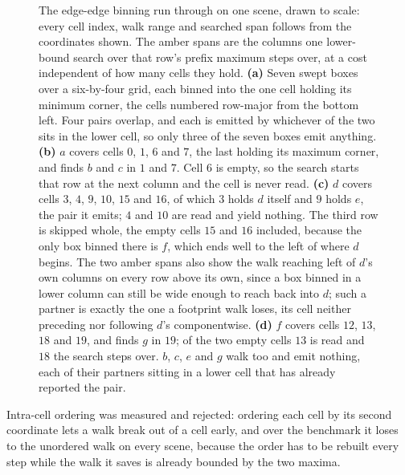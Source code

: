 \begin{figure}[htbp]
  \centering
  
  \caption{The edge-edge binning run through on one scene, drawn to scale: every
    cell index, walk range and searched span follows from the coordinates shown.
    The amber spans are the columns one lower-bound search over that row's
    prefix maximum steps over, at a cost independent of how many cells they
    hold. \textbf{(a)} Seven swept boxes over a six-by-four grid, each binned
    into the one cell holding its minimum corner, the cells numbered row-major
    from the bottom left. Four pairs overlap, and each is emitted by whichever
    of the two sits in the lower cell, so only three of the seven boxes emit
    anything. \textbf{(b)} $a$ covers cells $0$, $1$, $6$ and $7$, the last
    holding its maximum corner, and finds $b$ and $c$ in $1$ and $7$. Cell $6$
    is empty, so the search starts that row at the next column and the cell is
    never read. \textbf{(c)} $d$ covers cells $3$, $4$, $9$, $10$, $15$ and
    $16$, of which $3$ holds $d$ itself and $9$ holds $e$, the pair it emits;
    $4$ and $10$ are read and yield nothing. The third row is skipped whole, the
    empty cells $15$ and $16$ included, because the only box binned there is
    $f$, which ends well to the left of where $d$ begins. The two amber spans
    also show the walk reaching left of $d$'s own columns on every row above its
    own, since a box binned in a lower column can still be wide enough to reach
    back into $d$; such a partner is exactly the one a footprint walk loses, its
    cell neither preceding nor following $d$'s componentwise. \textbf{(d)} $f$
    covers cells $12$, $13$, $18$ and $19$, and finds $g$ in $19$; of the two
    empty cells $13$ is read and $18$ the search steps over. $b$, $c$, $e$ and
    $g$ walk too and emit nothing, each of their partners sitting in a lower
    cell that has already reported the pair.}
  \label{fig:cellmin}
\end{figure}

Intra-cell ordering was measured and rejected: ordering each cell by its second
coordinate lets a walk break out of a cell early, and over the benchmark it
loses to the unordered walk on every scene, because the order has to be rebuilt
every step while the walk it saves is already bounded by the two maxima.
